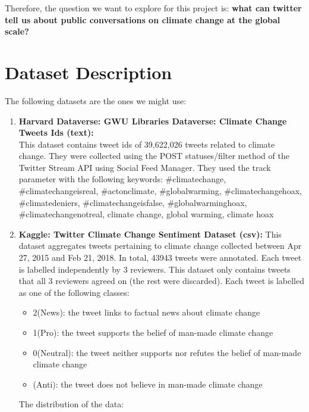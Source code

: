 \documentclass[fontsize=11pt]{article}
\begin{document}
\vspace{0.5 cm}

Therefore, the question we want to explore for this project is: \textbf{what can twitter tell us about public conversations on climate change at the global scale?}


\section*{Dataset Description}

The following datasets are the ones we might use:
\begin{enumerate}
\item\textbf{Harvard Dataverse: GWU Libraries Dataverse: Climate Change Tweets Ids (text):} 
\\This dataset contains tweet ids of 39,622,026 tweets related to climate change. They were collected using the POST statuses/filter method of the Twitter Stream API using Social Feed Manager. They used the track parameter with the following keywords: \#climatechange, \#climatechangeisreal, \#actonclimate, \#globalwarming, \#climatechangehoax, \#climatedeniers, \#climatechangeisfalse, \#globalwarminghoax, \#climatechangenotreal, climate change, global warming, climate hoax

\item\textbf{Kaggle: Twitter Climate Change Sentiment Dataset (csv):} This dataset aggregates tweets pertaining to climate change collected between Apr 27, 2015 and Feb 21, 2018. In total, 43943 tweets were annotated. Each tweet is labelled independently by 3 reviewers. This dataset only contains tweets that all 3 reviewers agreed on (the rest were discarded). Each tweet is labelled as one of the following classes:
    \begin{itemize}
        \item2(News): the tweet links to factual news about climate change
        \item1(Pro): the tweet supports the belief of man-made climate change
        \item0(Neutral): the tweet neither supports nor refutes the belief of man-made climate change
        \item(Anti): the tweet does not believe in man-made climate change
    \end{itemize}
The distribution of the data:


\end{enumerate}
\end{document}
